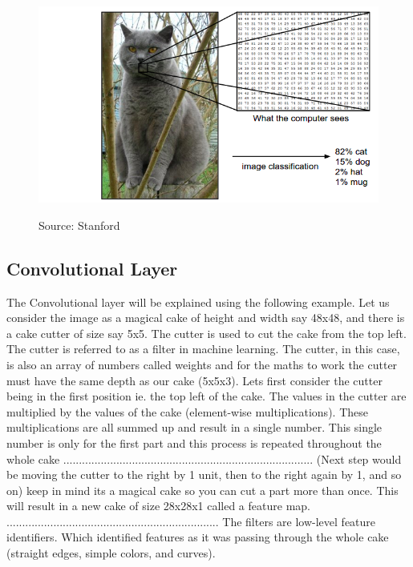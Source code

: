 \documentclass[12pt, a4paper,oneside]{report}
\newcommand{\source}[1]{\vspace{-3pt} \caption*{ Source: {#1}} }
\begin{document}
\begin{figure}[htb!]
	\includegraphics [scale=0.5] {cat}
	\label{fig:cat}
	\source{Stanford~\cite{softmax}}
\end{figure}

\subsection{Convolutional Layer}
The Convolutional layer will be explained using the following example. Let us consider the image as a magical cake of height and width say 48x48, and there is a cake cutter of size say 5x5. The cutter is used to cut the cake from the top left. The cutter is referred to as a filter in machine learning. The cutter, in this case, is also an array of numbers called weights and for the maths to work the cutter must have the same depth as our cake (5x5x3). Lets first consider the cutter being in the first position ie. the top left of the cake. The values in the cutter are multiplied by the values of the cake (element-wise multiplications). These multiplications are all summed up and result in a single number. This single number is only for the first part and this process is repeated throughout the whole cake
................................................................................
(Next step would be moving the cutter to the right by 1 unit, then to the right again by 1, and so on) keep in mind its a magical cake so you can cut a part more than once. This will result in a new cake of size 28x28x1 called a feature map. 
....................................................................
The filters are low-level feature identifiers. Which identified features as it was passing through the whole cake (straight edges, simple colors, and curves). 
\end{document}
